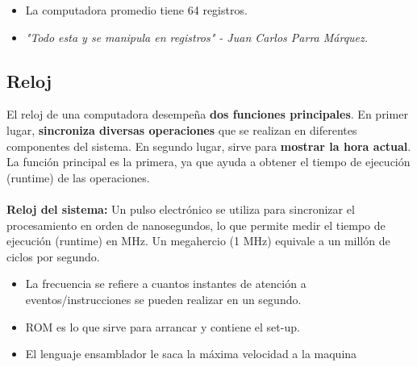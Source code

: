 \documentclass{templateNote}
\begin{document}
\begin{tcolorbox}[colback=orange!10!white,colframe=orange!75!black,title=Observaciones]
    \begin{itemize}
        \item La computadora promedio tiene 64 registros.%
        \item \textit{"Todo esta y se manipula en registros" \space - Juan Carlos Parra Márquez.}
    \end{itemize}
\end{tcolorbox}
\newpage

\subsection*{\textbf{Reloj}}
\noindent El reloj de una computadora desempeña \textbf{dos funciones principales}. En primer lugar, \textbf{sincroniza diversas operaciones} que se realizan en diferentes componentes del sistema. 
En segundo lugar, sirve para \textbf{mostrar la hora actual}. La función principal es la primera, ya que ayuda a obtener el tiempo de ejecución (runtime) de las operaciones. \\\\
\textbf{Reloj del sistema:} Un pulso electrónico se utiliza para sincronizar el procesamiento en orden de nanosegundos, lo que permite medir el tiempo de ejecución (runtime) en MHz. 
Un megahercio (1 MHz) equivale a un millón de ciclos por segundo. 

\begin{tcolorbox}[colback=orange!10!white,colframe=orange!75!black,title=Observaciones]
    \begin{itemize}
        \item La frecuencia se refiere a cuantos instantes de atención a eventos/instrucciones se pueden realizar en un segundo.
        \item ROM es lo que sirve para arrancar y contiene el set-up.
        \item El lenguaje ensamblador le saca la máxima velocidad a la maquina
    \end{itemize}
\end{tcolorbox}
\end{document}
